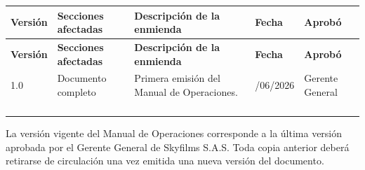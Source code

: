 \begin{longtable}{|>{\centering\arraybackslash}p{1.6cm}|p{3.0cm}|p{5.6cm}|>{\centering\arraybackslash}p{1.9cm}|p{2.3cm}|}

\hline

\rowcolor{gray!20}

\textbf{Versión} &
\textbf{Secciones afectadas} &
\textbf{Descripción de la enmienda} &
\textbf{Fecha} &
\textbf{Aprobó}

\\
\hline

\endfirsthead

\hline

\rowcolor{gray!20}

\textbf{Versión} &
\textbf{Secciones afectadas} &
\textbf{Descripción de la enmienda} &
\textbf{Fecha} &
\textbf{Aprobó}

\\
\hline

\endhead

1.0 &
Documento completo &
Primera emisión del Manual de Operaciones. &
23/06/2026 &
Gerente General

\\
\hline

&
&
&
&
\\
\hline

&
&
&
&
\\
\hline

&
&
&
&
\\
\hline

&
&
&
&
\\
\hline

\end{longtable}

\vspace{0.4cm}

\begin{tcolorbox}[
colback=gray!5,
colframe=black,
title=Control Documental]

La versión vigente del Manual de Operaciones corresponde a la última versión aprobada por el Gerente General de Skyfilms S.A.S. Toda copia anterior deberá retirarse de circulación una vez emitida una nueva versión del documento.

\end{tcolorbox}